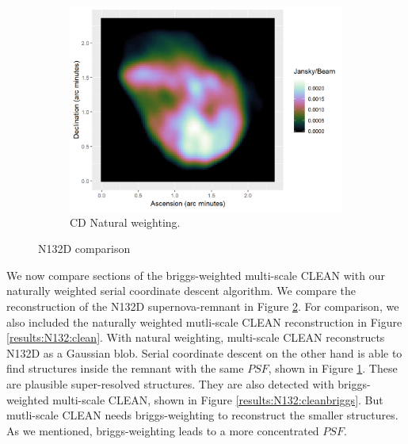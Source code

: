 \begin{figure}[h]
\begin{subfigure}[b]{0.32\linewidth}
		\includegraphics[width=1.00\linewidth]{./chapters/10.results/SerialCD/CD-N132.png}
		\caption{CD Natural weighting.}
		\label{results:comp:N132:cd}
	\end{subfigure}
	\caption{N132D comparison}
	\label{results:cleancomp::N132:figure}
\end{figure}

We now compare sections of the briggs-weighted multi-scale CLEAN with our naturally weighted serial coordinate descent algorithm. We compare the reconstruction of the N132D supernova-remnant in Figure \ref{results:cleancomp::N132:figure}. For comparison, we also included the naturally weighted mutli-scale CLEAN reconstruction in Figure \ref{results:N132:clean}. With natural weighting, multi-scale CLEAN reconstructs N132D as a Gaussian blob. Serial coordinate descent on the other hand is able to find structures inside the remnant with the same $PSF$, shown in Figure \ref{results:comp:N132:cd}. These are plausible super-resolved structures. They are also detected with briggs-weighted multi-scale CLEAN, shown in Figure \ref{results:N132:cleanbriggs}. But mutli-scale CLEAN needs briggs-weighting to reconstruct the smaller structures. As we mentioned, briggs-weighting leads to a more concentrated $PSF$.


